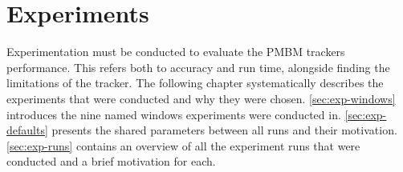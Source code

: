 \section{Experiments}
\label{sec:experiments}

Experimentation must be conducted to evaluate the PMBM trackers performance. This refers both to accuracy and run time, alongside finding the limitations of the tracker. The following chapter systematically describes the experiments that were conducted and why they were chosen. \autoref{sec:exp-windows} introduces the nine named windows experiments were conducted in. \autoref{sec:exp-defaults} presents the shared parameters between all runs and their motivation. \autoref{sec:exp-runs} contains an overview of all the experiment runs that were conducted and a brief motivation for each.


